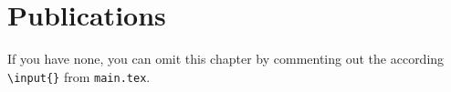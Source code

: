 \chapter*{Publications}\label{ch:publication}

If you have none, you can omit this chapter by commenting out the according \texttt{\textbackslash{}input\{\}} from \texttt{main.tex}.
